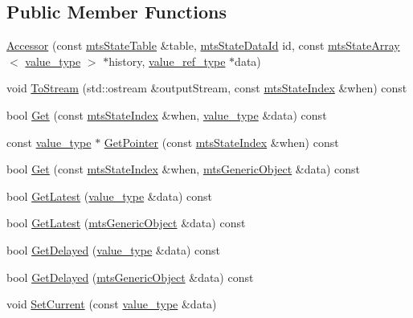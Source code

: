 \subsection*{Public Member Functions}
\begin{DoxyCompactItemize}
\item 
\hyperlink{classmts_state_table_1_1_accessor_abf8c0fc4ede80f1e147e3eb973dc7986}{Accessor} (const \hyperlink{classmts_state_table}{mts\+State\+Table} \&table, \hyperlink{mts_state_table_8h_ac3a0e34e8991d51790b043fa01857a35}{mts\+State\+Data\+Id} id, const \hyperlink{classmts_state_array}{mts\+State\+Array}$<$ \hyperlink{classmts_generic_object_proxy}{value\+\_\+type} $>$ $\ast$history, \hyperlink{classmts_generic_object_proxy_ref}{value\+\_\+ref\+\_\+type} $\ast$data)
\item 
void \hyperlink{classmts_state_table_1_1_accessor_af084d82f7dbdaefdb60ddd415d68dfe9}{To\+Stream} (std\+::ostream \&output\+Stream, const \hyperlink{classmts_state_index}{mts\+State\+Index} \&when) const 
\item 
bool \hyperlink{classmts_state_table_1_1_accessor_ae0f8e995ce012dcf00d30575315957b8}{Get} (const \hyperlink{classmts_state_index}{mts\+State\+Index} \&when, \hyperlink{classmts_generic_object_proxy}{value\+\_\+type} \&data) const 
\item 
const \hyperlink{classmts_generic_object_proxy}{value\+\_\+type} $\ast$ \hyperlink{classmts_state_table_1_1_accessor_aa603b30d82c5343d03ac3aceeed3fc8d}{Get\+Pointer} (const \hyperlink{classmts_state_index}{mts\+State\+Index} \&when) const 
\item 
bool \hyperlink{classmts_state_table_1_1_accessor_a8ed438d66407ab1e336d67d721ab7a67}{Get} (const \hyperlink{classmts_state_index}{mts\+State\+Index} \&when, \hyperlink{classmts_generic_object}{mts\+Generic\+Object} \&data) const 
\item 
bool \hyperlink{classmts_state_table_1_1_accessor_a91e735c0023b796d0ddbcb5ec10b2213}{Get\+Latest} (\hyperlink{classmts_generic_object_proxy}{value\+\_\+type} \&data) const 
\item 
bool \hyperlink{classmts_state_table_1_1_accessor_a00fc295cb64007c7012e19389dddbcf7}{Get\+Latest} (\hyperlink{classmts_generic_object}{mts\+Generic\+Object} \&data) const 
\item 
bool \hyperlink{classmts_state_table_1_1_accessor_ad6abf9b013d69b6d2d76bc3d8a291f9d}{Get\+Delayed} (\hyperlink{classmts_generic_object_proxy}{value\+\_\+type} \&data) const 
\item 
bool \hyperlink{classmts_state_table_1_1_accessor_a472b9f6daddfcf0f30fa84d25c08d910}{Get\+Delayed} (\hyperlink{classmts_generic_object}{mts\+Generic\+Object} \&data) const 
\item 
void \hyperlink{classmts_state_table_1_1_accessor_aad12d6d36beefc5e24cd469fd82f5b81}{Set\+Current} (const \hyperlink{classmts_generic_object_proxy}{value\+\_\+type} \&data)
\end{DoxyCompactItemize}
